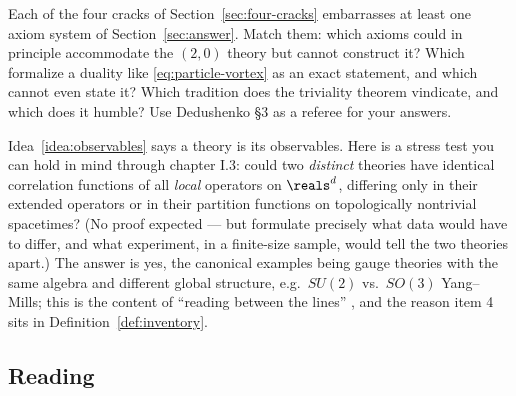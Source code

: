 \begin{exercise}[thinker]
\label{exr:axioms-vs-cracks}
Each of the four cracks of Section~\ref{sec:four-cracks} embarrasses at least
one axiom system of Section~\ref{sec:answer}. Match them: which axioms could in
principle accommodate the $(2,0)$ theory but cannot construct it? Which
formalize a duality like \eqref{eq:particle-vortex} as an exact statement, and
which cannot even state it? Which tradition does the triviality theorem
vindicate, and which does it humble? Use Dedushenko  \S3 as a
referee for your answers.
\end{exercise}

\begin{exercise}[thinker]
\label{exr:two-theories-same-correlators}
Idea~\ref{idea:observables} says a theory is its observables. Here is a stress
test you can hold in mind through chapter I.3: could two \emph{distinct}
theories have identical correlation functions of all \emph{local} operators on
$\reals^d$, differing only in their extended operators or in their partition
functions on topologically nontrivial spacetimes? (No proof expected --- but
formulate precisely what data would have to differ, and what experiment, in a
finite-size sample, would tell the two theories apart.) The answer is yes, the
canonical examples being gauge theories with the same algebra and different
global structure, e.g.\ $SU(2)$ vs.\ $SO(3)$ Yang--Mills; this is the content of
``reading between the lines'' , and the reason item 4 sits in
Definition~\ref{def:inventory}.
\end{exercise}

\subsection*{Reading}

